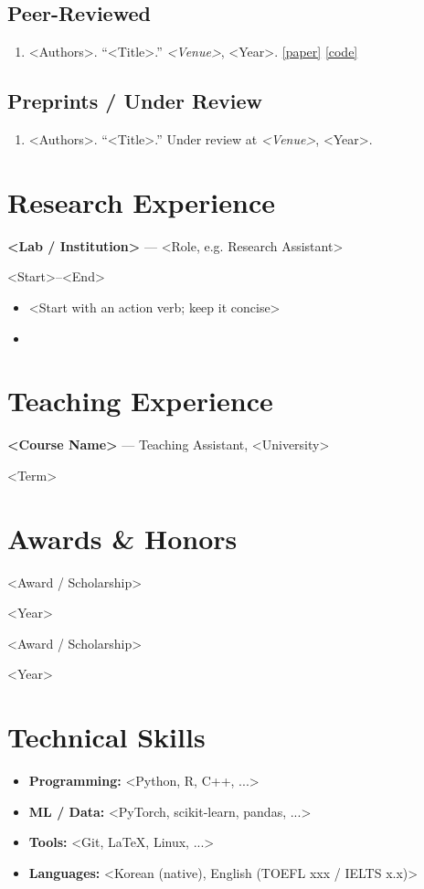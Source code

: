 \documentclass[11pt,a4paper]{article}
\newcommand{\entry}[2]{%
  \noindent\begin{minipage}[t]{0.80\textwidth}#1\end{minipage}%
  \hfill\begin{minipage}[t]{0.19\textwidth}\raggedleft #2\end{minipage}\par}
\begin{document}
\subsection*{Peer-Reviewed}
\begin{enumerate}[leftmargin=1.6em, label=\arabic*.]
  \item <Authors>. ``<Title>.'' \textit{<Venue>}, <Year>.
        \href{https://<link>}{[paper]} \href{https://<link>}{[code]}
\end{enumerate}

\subsection*{Preprints / Under Review}
\begin{enumerate}[leftmargin=1.6em, label=\arabic*.]
  \item <Authors>. ``<Title>.'' Under review at \textit{<Venue>}, <Year>.
\end{enumerate}

\section{Research Experience}
\entry{\textbf{<Lab / Institution>} --- <Role, e.g. Research Assistant>}{<Start>--<End>}
\begin{itemize}
  \item <Start with an action verb; keep it concise>
  \item <Quantify results with numbers where possible>
\end{itemize}

\section{Teaching Experience}
\entry{\textbf{<Course Name>} --- Teaching Assistant, <University>}{<Term>}

\section{Awards \& Honors}
\entry{<Award / Scholarship>}{<Year>}
\entry{<Award / Scholarship>}{<Year>}

\section{Technical Skills}
\begin{itemize}
  \item \textbf{Programming:} <Python, R, C++, ...>
  \item \textbf{ML / Data:} <PyTorch, scikit-learn, pandas, ...>
  \item \textbf{Tools:} <Git, LaTeX, Linux, ...>
  \item \textbf{Languages:} <Korean (native), English (TOEFL xxx / IELTS x.x)>
\end{itemize}
\end{document}
